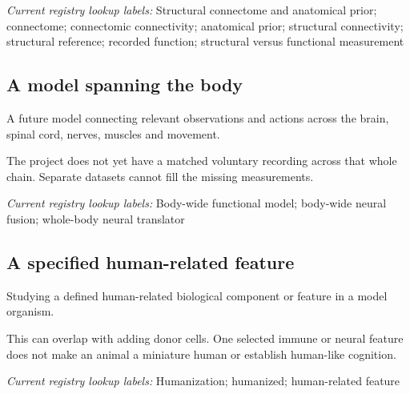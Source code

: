 \noindent\textit{Current registry lookup labels:} Structural connectome and anatomical prior; connectome; connectomic connectivity; anatomical prior; structural connectivity; structural reference; recorded function; structural versus functional measurement\par

\begin{samepage}
\subsection*{A model spanning the body}
\noindent A future model connecting relevant observations and actions across the brain, spinal cord, nerves, muscles and movement.\par
\end{samepage}
\begin{samepage}
\noindent The project does not yet have a matched voluntary recording across that whole chain. Separate datasets cannot fill the missing measurements.\par\nopagebreak[4]

\end{samepage}


\noindent\textit{Current registry lookup labels:} Body-wide functional model; body-wide neural fusion; whole-body neural translator\par

\begin{samepage}
\subsection*{A specified human-related feature}
\noindent Studying a defined human-related biological component or feature in a model organism.\par
\end{samepage}
\begin{samepage}
\noindent This can overlap with adding donor cells. One selected immune or neural feature does not make an animal a miniature human or establish human-like cognition.\par\nopagebreak[4]

\end{samepage}


\noindent\textit{Current registry lookup labels:} Humanization; humanized; human-related feature\par

